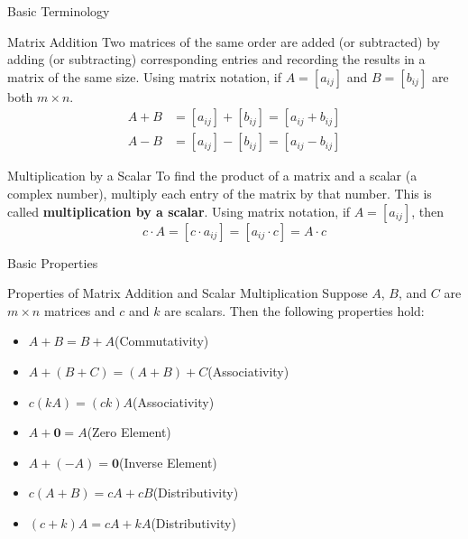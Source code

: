 \documentclass{beamer}
\begin{document}
\begin{frame}{Basic Terminology}

\begin{block}{Matrix Addition}
Two matrices of the same order are added (or subtracted) by adding (or subtracting) corresponding entries and recording the results in a matrix of the same size. Using matrix notation, if $A=[a_{ij}]$ and $B=[b_{ij}]$ are both $m\times n$.
\begin{equation*}
\begin{split}
A+B&=[a_{ij}]+[b_{ij}]=[a_{ij}+b_{ij}]\\
A-B&=[a_{ij}]-[b_{ij}]=[a_{ij}-b_{ij}]
\end{split}
\end{equation*}
\end{block}\pause
\begin{block}{Multiplication by a Scalar}
To find the product of a matrix and a scalar (a complex number), multiply each entry of the matrix by that number. This is called \textbf{multiplication by a scalar}. Using matrix notation, if $A=[a_{ij}]$, then
\[c\cdot A=[c\cdot a_{ij}] = [a_{ij}\cdot c] = A\cdot c\]
\end{block}
\end{frame}

\begin{frame}{Basic Properties}
\begin{block}{Properties of Matrix Addition and Scalar Multiplication}
Suppose $A$, $B$, and $C$ are $m\times n$ matrices and $c$ and $k$ are scalars. Then the following properties hold:
\begin{itemize}
\item<+->$A+B=B+A$\hfill(Commutativity)
\item<+->$A+(B+C)=(A+B)+C$\hfill(Associativity)
\item<+->$c(kA)=(ck)A$\hfill(Associativity)
\item<+->$A+\textbf{0}=A$\hfill(Zero Element)
\item<+->$A+(-A)=\textbf{0}$\hfill(Inverse Element)
\item<+->$c(A+B)=cA+cB$\hfill(Distributivity)
\item<+->$(c+k)A=cA+kA$\hfill(Distributivity)
\end{itemize}
\end{block}
\end{frame}
\end{document}
